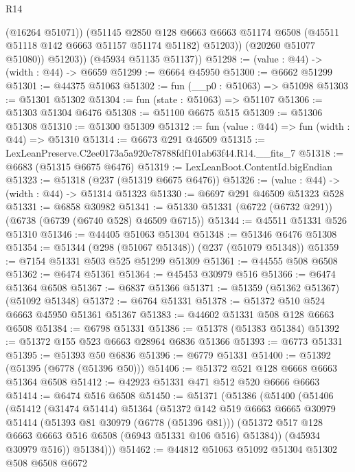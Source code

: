 \begin{lexlean}{R14}
\begin{coremodule}
                (@16264 @51071))
              (@51145
                @2850
                @128
                @6663
                @6663
                @51174
                @6508
                (@45511 @51118 @142 @6663 @51157 @51174 @51182)
                @51203))
            (@20260 @51077 @51080))
          @51203))
      (@45934 @51135 @51137))
@51298 := (value : @44) -> (width : @44) -> @6659
@51299 := @6664 @45950
@51300 := @6662 @51299
@51301 := @44375 @51063
@51302 := fun (__p0 : @51063) => @51098
@51303 := @51301 @51302
@51304 := fun (state : @51063) => @51107
@51306 := @51303 @51304 @6476
@51308 := @51100 @6675 @515
@51309 := @51306 @51308
@51310 := @51300 @51309
@51312 := fun (value : @44) => fun (width : @44) => @51310
@51314 := @6673 @291 @46509
@51315 := LexLeanPreserve.C2ee0173a5a920c78788fdf101ab63f44.R14.__fits_7
@51318 := @6683 (@51315 @6675 @6476)
@51319 := LexLeanBoot.ContentId.bigEndian
@51323 := @51318 (@237 (@51319 @6675 @6476))
@51326 := (value : @44) -> (width : @44) -> @51314 @51323
@51330 := @6697 @291 @46509 @51323 @528
@51331 := @6858 @30982
@51341 := @51330 @51331 (@6722 (@6732 @291)) (@6738 (@6739 (@6740 @528) @46509 @6715))
@51344 := @45511 @51331 @526 @51310
@51346 := @44405 @51063 @51304
@51348 := @51346 @6476 @51308
@51354 := @51344 (@298 (@51067 @51348)) (@237 (@51079 @51348))
@51359 := @7154 @51331 @503 @525 @51299 @51309
@51361 := @44555 @508 @6508
@51362 := @6474 @51361
@51364 := @45453 @30979 @516
@51366 := @6474 @51364 @6508
@51367 := @6837 @51366
@51371 := @51359 (@51362 @51367) (@51092 @51348)
@51372 := @6764 @51331
@51378 := @51372 @510 @524 @6663 @45950 @51361 @51367
@51383 := @44602 @51331 @508 @128 @6663 @6508
@51384 := @6798 @51331
@51386 := @51378 (@51383 @51384)
@51392 := @51372 @155 @523 @6663 @28964 @6836 @51366
@51393 := @6773 @51331
@51395 := @51393 @50 @6836
@51396 := @6779 @51331
@51400 := @51392 (@51395 (@6778 (@51396 @50)))
@51406 := @51372 @521 @128 @6668 @6663 @51364 @6508
@51412 := @42923 @51331 @471 @512 @520 @6666 @6663
@51414 := @6474 @516 @6508
@51450 := @51371
    (@51386
      (@51400
        (@51406
          (@51412
            (@31474 @51414)
            @51364
            (@51372
              @142
              @519
              @6663
              @6665
              @30979
              @51414
              (@51393 @81 @30979 (@6778 (@51396 @81)))
              (@51372 @517 @128 @6663 @6663 @516 @6508 (@6943 @51331 @106 @516) @51384))
            (@45934 @30979 @516))
          @51384)))
@51462 := @44812
    @51063
    @51092
    @51304
    @51302
    @508
    @6508
    @6672

\end{coremodule}
\end{lexlean}
